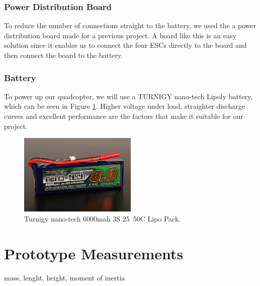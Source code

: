 \subsubsection{Power Distribution Board}
To reduce the number of connections straight to the battery, we used the a power distribution board made for a previous project. A board like this is an easy solution since it enables us to connect the four ESCs directly to the board and then connect the board to the battery.

\subsubsection{Battery}
To power up our quadcopter, we will use a TURNIGY nano-tech Lipoly battery, which can be seen in Figure \ref{battery}. Higher voltage under load, straighter discharge curves and excellent performance are the factors that make it suitable for our project. 

\begin{figure}[H]
  \centering
    \includegraphics[width=0.5\textwidth]{images/battery.jpg}
	\caption{Turnigy nano-tech 6000mah 3S 25~50C Lipo Pack.}
	\label{battery}
\end{figure}

\section{Prototype Measurements}
mass, lenght, height, moment of inertia

